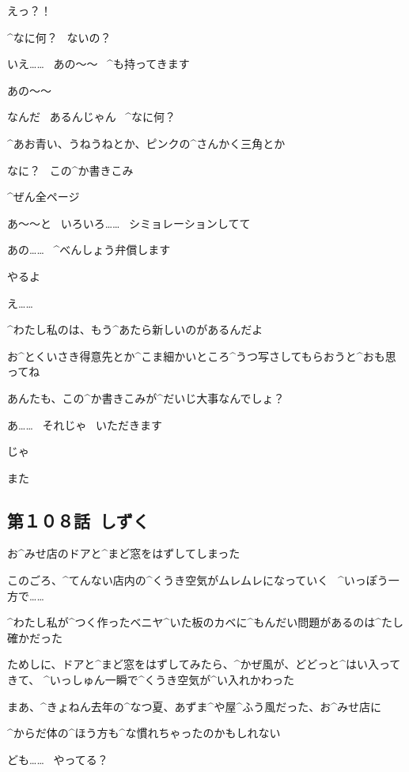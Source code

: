 \Alpha えっ？！

\Maruko ^{なに}{何}？
\ ないの？

\Alpha いえ……
\ あの〜〜
\ ^{も}{持}ってきます

\page
\Alpha あの〜〜

\Maruko なんだ
\ あるんじゃん
\ ^{なに}{何}？

\Maruko ^{あお}{青}い、うねうねとか、ピンクの^{さんかく}{三角}とか

\Maruko なに？
\ この^{か}{書}きこみ

\Maruko ^{ぜん}{全}ページ

\Alpha あ〜〜と
\ いろいろ……
\ シミョレーションしてて

\page
\Alpha あの……
\ ^{べんしょう}{弁償}します

\Maruko やるよ

\Alpha え……

\Maruko ^{わたし}{私}のは、もう^{あたら}{新}しいのがあるんだよ

\Maruko お^{とくいさき}{得意先}とか^{こま}{細}かいところ^{うつ}{写}さしてもらおうと^{おも}{思}ってね

\Maruko あんたも、この^{か}{書}きこみが^{だいじ}{大事}なんでしょ？

\Alpha あ……
\ それじゃ
\ いただきます

\page
\Maruko じゃ

\Alpha また


\subsection{第１０８話\ しずく}

\page[118]
\Alpha お^{みせ}{店}のドアと^{まど}{窓}をはずしてしまった

\page
\Alpha このごろ、^{てんない}{店内}の^{くうき}{空気}がムレムレになっていく
\ ^{いっぽう}{一方}で……

\Alpha ^{わたし}{私}が^{つく}{作}ったベニヤ^{いた}{板}のカベに^{もんだい}{問題}があるのは^{たし}{確}かだった

\Alpha ためしに、ドアと^{まど}{窓}をはずしてみたら、^{かぜ}{風}が、どどっと^{はい}{入}ってきて、
^{いっしゅん}{一瞬}で^{くうき}{空気}が^{い}{入}れかわった

\Alpha まあ、^{きょねん}{去年}の^{なつ}{夏}、あずま^{や}{屋}^{ふう}{風}だった、お^{みせ}{店}に

\Alpha ^{からだ}{体}の^{ほう}{方}も^{な}{慣}れちゃったのかもしれない

\page
\Person ども……
\ やってる？

